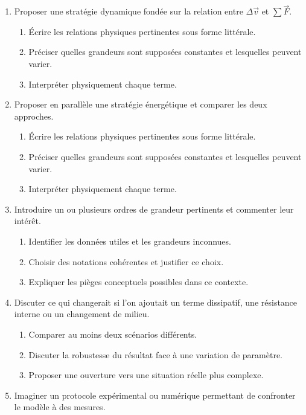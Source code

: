 \documentclass[11pt,a4paper]{article}
\begin{document}
\begin{enumerate}[label=\textbf{Très long \arabic*.},leftmargin=*]
\begin{enumerate}[label=\textbf{\arabic*)}]
\begin{enumerate}[label=\alph*)]
\item Interpréter physiquement chaque terme.
\end{enumerate}
\item Proposer une stratégie dynamique fondée sur la relation entre $\Delta\vec v$ et $\sum\vec F$.
\begin{enumerate}[label=\alph*)]
\item Écrire les relations physiques pertinentes sous forme littérale.
\item Préciser quelles grandeurs sont supposées constantes et lesquelles peuvent varier.
\item Interpréter physiquement chaque terme.
\end{enumerate}
\item Proposer en parallèle une stratégie énergétique et comparer les deux approches.
\begin{enumerate}[label=\alph*)]
\item Écrire les relations physiques pertinentes sous forme littérale.
\item Préciser quelles grandeurs sont supposées constantes et lesquelles peuvent varier.
\item Interpréter physiquement chaque terme.
\end{enumerate}
\item Introduire un ou plusieurs ordres de grandeur pertinents et commenter leur intérêt.
\begin{enumerate}[label=\alph*)]
\item Identifier les données utiles et les grandeurs inconnues.
\item Choisir des notations cohérentes et justifier ce choix.
\item Expliquer les pièges conceptuels possibles dans ce contexte.
\end{enumerate}
\item Discuter ce qui changerait si l'on ajoutait un terme dissipatif, une résistance interne ou un changement de milieu.
\begin{enumerate}[label=\alph*)]
\item Comparer au moins deux scénarios différents.
\item Discuter la robustesse du résultat face à une variation de paramètre.
\item Proposer une ouverture vers une situation réelle plus complexe.
\end{enumerate}
\item Imaginer un protocole expérimental ou numérique permettant de confronter le modèle à des mesures.

\end{enumerate}
\end{enumerate}
\end{document}
